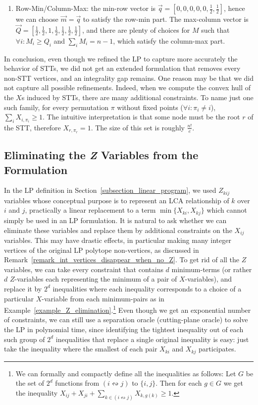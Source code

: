 \begin{enumerate}
    \item Row-Min/Column-Max: the min-row vector is $\vec{q} = [0,0,0,0,0,\frac{1}{2},\frac{1}{2}]$, hence we can choose $\vec{m} = \vec{q}$ to satisfy the row-min part. The max-column vector is $\vec{Q} = [\frac{1}{2},\frac{1}{2},1,\frac{1}{2},\frac{1}{2},\frac{1}{2},\frac{1}{2}]$, and there are plenty of choices for $M$ such that $\forall i: M_i \ge Q_i$ and $\sum_i{M_i} = n-1$, which satisfy the column-max part.
\end{enumerate}

In conclusion, even though we refined the LP to capture more accurately the behavior of STTs, we did not get an extended formulation that removes every non-STT vertices, and an integrality gap remains. One reason may be that we did not capture all possible refinements. Indeed, when we compute the convex hull of the $X$s induced by STTs, there are many additional constraints. To name just one such family, for every permutation $\pi$ without fixed points ($\forall i: \pi_i \ne i$), $\sum_i{X_{i,\pi_i}} \ge 1$. The intuitive interpretation is that some node must be the root $r$ of the STT, therefore $X_{r,\pi_r} = 1$. The size of this set is roughly $\frac{n!}{e}$.






\subsection{Eliminating the \emph{Z} Variables from the Formulation}
\label{subsection_with_and_without_z_fourier_motzkin}
In the LP definition in Section~\ref{subsection_linear_program}, we used $Z_{kij}$ variables whose conceptual purpose is to represent an LCA relationship of $k$ over $i$ and $j$, practically a linear replacement to a term $\min\{X_{ki},X_{kj}\}$ which cannot simply be used in an LP formulation. It is natural to ask whether we can eliminate these variables and replace them by additional constraints on the $X_{ij}$ variables. This may have drastic effects, in particular making many integer vertices of the original LP polytope non-vertices, as discussed in Remark~\ref{remark_int_vertices_disappear_when_no_Z}. To get rid of all the $Z$ variables, we can take every constraint that  contains $d$ minimum-terms (or rather $d$ $Z$-variables each representing the minimum of a pair of $X$-variables), and replace it by $2^d$ inequalities where each inequality corresponds to a choice of a particular $X$-variable from each  minimum-pairs as in Example~\ref{example_Z_elimination}.\footnote{We can formally and compactly define all the inequalities as follows: Let $G$ be the set of $2^d$ functions from $(i \leftrightsquigarrow j)$ to $\{i,j\}$. Then for each $g \in G$ we get the inequality $X_{ij}+X_{ji} + \sum_{k \in (i \leftrightsquigarrow j)}{X_{k,g(k)}} \ge 1$.}
Even though we get an exponential number of constraints, we can still use a separation oracle (cutting-plane oracle) to solve the LP in polynomial time, since identifying the tightest inequality out of each such group of $2^d$ inequalities that replace a single original inequality is easy:
 just take the inequality where the smallest of each pair $X_{ki}$ and $X_{kj}$ participates.

